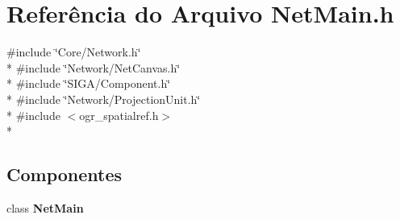\section{Referência do Arquivo Net\+Main.\+h}
\label{_net_main_8h}
{\ttfamily \#include \char`\"{}Core/\+Network.\+h\char`\"{}}\\*
{\ttfamily \#include \char`\"{}Network/\+Net\+Canvas.\+h\char`\"{}}\\*
{\ttfamily \#include \char`\"{}S\+I\+G\+A/\+Component.\+h\char`\"{}}\\*
{\ttfamily \#include \char`\"{}Network/\+Projection\+Unit.\+h\char`\"{}}\\*
{\ttfamily \#include $<$ogr\+\_\+spatialref.\+h$>$}\\*
\subsection*{Componentes}
\begin{DoxyCompactItemize}
\item 
class {\bf Net\+Main}
\end{DoxyCompactItemize}
